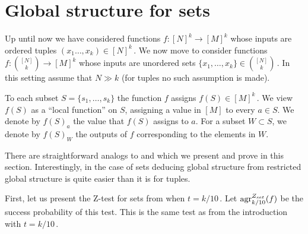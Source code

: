\documentclass{toc}
\newcommand{\set}[1]{\{#1\}} %
\newcommand\setf{f} %
\newcommand{\test}[2]{
	\ifx &#2&
	\textrm{agr}^{#1}
	\else	
	\textrm{agr}^{#1}_{#2}
	\fi}
\begin{document}
\section{Global structure for sets}\label{sec:sets}
Up until now we have considered functions $f:[N]^k\to[M]^k$ whose inputs are ordered tuples $(x_1\ldots,x_k)\in [N]^k$\,. We now move to consider functions $f:\binom {[N]} k \to[M]^k$ whose inputs are unordered sets $\set{x_1,\ldots,x_k} \in \binom{[N]}k$\,. In this setting assume that $N\gg k$ (for tuples no such assumption is made).


To each subset $S=\set{s_1,\ldots,s_k} $ the function $f$ assigns $f(S)\in [M]^k$\,. We view $f(S)$ as a ``local function'' on $S$, assigning a value in $[M]$ to every $a\in S$. We denote by $\setf(S)_a$ the value that $\setf(S)$ assigns to $a$. For a subset $W\subset S$, we denote by $\setf(S)_W$ the outputs of $\setf$ corresponding to the elements in $W$.

There are straightforward analogs to  and  which we present and prove in this section. Interestingly, in the case of sets deducing global structure from restricted global structure is quite easier than it is for tuples.

First, let us present the %
Z-test %
for sets from \cite{impagliazzo2012new} when $t=k/10$\,. Let $\test{Z_{set}}{k/10}(\setf)$ be the success probability of this test. This is the same test as  from the introduction with $t=k/10$\,.
\end{document}
